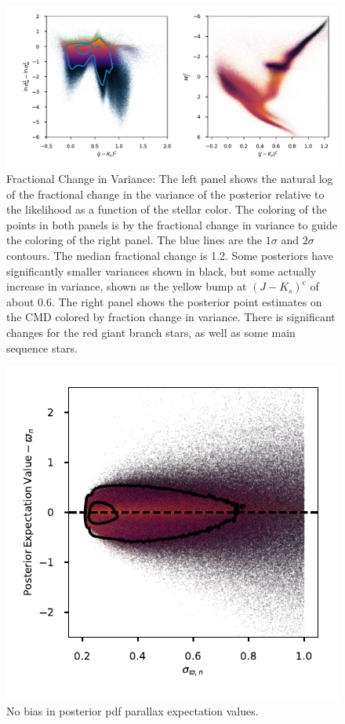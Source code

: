 \documentclass[modern]{aastex61}
\newcommand{\corr}{\mathrm{c}}
\begin{document}
\begin{figure}
\centering
\includegraphics[width=\textwidth]{delta.pdf}
\caption{Fractional Change in Variance: The left panel shows the natural log of the fractional change in the variance of the posterior relative to the likelihood as a function of the stellar color. The coloring of the points in both panels is by the fractional change in variance to guide the coloring of the right panel. The blue lines are the $1\sigma$ and $2\sigma$ contours. The median fractional change is 1.2. Some posteriors have significantly smaller variances shown in black, but some actually increase in variance, shown as the yellow bump at $(J-K_s)^{\corr}$ of about 0.6. The right panel shows the posterior point estimates on the CMD colored by fraction change in variance. There is significant changes for the red giant branch stars, as well as some main sequence stars.}
\label{fig:delta}
\end{figure}

\begin{figure}
\centering
\includegraphics[width=\textwidth]{deltaParallax.pdf}
\caption{No bias in posterior pdf parallax expectation values.}
\label{fig:delta}
\end{figure}
\end{document}
